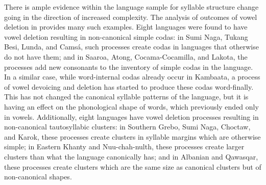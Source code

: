   There is ample evidence within the language sample for syllable structure change going in the direction of increased complexity. The analysis of outcomes of vowel deletion in  provides many such examples. Eight languages were found to have vowel deletion resulting in non-canonical simple codas: in Sumi Naga, Tukang Besi, Lunda, and Camsá, such processes create codas in languages that otherwise do not have them; and in Saaroa, Atong, Cocama-Cocamilla, and Lakota, the processes add new consonants to the inventory of simple codas in the language. In a similar case, while word-internal codas already occur in Kambaata, a process of vowel devoicing and deletion has started to produce these codas word-finally. This has not changed the canonical syllable patterns of the language, but it is having an effect on the phonological shape of words, which previously ended only in vowels. Additionally, eight languages have vowel deletion processes resulting in non-canonical tautosyllabic clusters: in Southern Grebo, Sumi Naga, Choctaw, and Karok, these processes create clusters in syllable margins which are otherwise simple; in Eastern Khanty and Nuu-chah-nulth, these processes create larger clusters than what the language canonically has; and in Albanian and Qawasqar, these processes create clusters which are the same size as canonical clusters but of non-canonical shapes.



